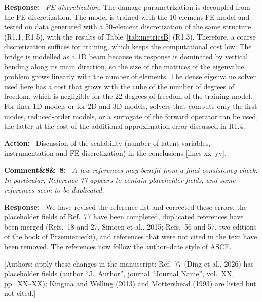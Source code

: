 \documentclass[11pt]{article}
\newenvironment{rcomment}[1]{\par\bigskip\noindent\textbf{Comment\ifx&#1&\else\ #1\fi:}\ \itshape}{\par}
\newenvironment{response}{\par\smallskip\noindent\color{resp}\textbf{Response:}\ }{\par}
\newenvironment{action}{\par\smallskip\noindent\color{resp}\textbf{Action:}\ }{\par}
\newcommand{\authornote}[1]{\textcolor{note}{\textsf{[Authors: #1]}}}
\newcommand{\tbd}[1]{\textcolor{note}{\textsf{[#1]}}}
\newcommand{\lines}[1]{\tbd{lines #1}}
\begin{document}
\begin{response}
\textit{FE discretization.} The damage parametrization is decoupled from the FE discretization. The model is trained
with the 10-element FE model and tested on data generated with a 50-element discretization of the same structure (R1.1,
R1.5), with the results of Table~\ref{tab:metricsB} (R1.3). Therefore, a coarse discretization suffices for training,
which keeps the computational cost low. The bridge is modelled as a 1D beam because its response is dominated by
vertical bending along its main direction, so the size of the matrices of the eigenvalue problem grows linearly with
the number of elements. The dense eigenvalue solver used here has a cost that grows with the cube of the number of
degrees of freedom, which is negligible for the 22 degrees of freedom of the training model. For finer 1D models or for
2D and 3D models, solvers that compute only the first modes, reduced-order models, or a surrogate of the forward
operator can be used, the latter at the cost of the additional approximation error discussed in R1.4.
\end{response}

\begin{action}
Discussion of the scalability (number of latent variables, instrumentation and FE discretization) in the conclusions
\lines{xx--yy}.
\end{action}

\begin{rcomment}{8}
A few references may benefit from a final consistency check. In particular, Reference 77 appears to contain placeholder fields, and some references seem to be duplicated.
\end{rcomment}

\begin{response}
We have revised the reference list and corrected these errors: the placeholder fields of Ref.~77 have been completed,
duplicated references have been merged (Refs.~18 and 27, Simoen et al., 2015; Refs.~56 and 57, two editions of the book
of Przemieniecki), and references that were not cited in the text have been removed. The references now follow the
author--date style of ASCE.
\end{response}
\authornote{apply these changes in the manuscript: Ref.~77 (Ding et al., 2026) has placeholder fields (author ``J.~Author'',
journal ``Journal Name'', vol.~XX, pp.~XX--XX); Kingma and Welling (2013) and Mottershead (1993) are listed but not
cited.}
\end{document}
